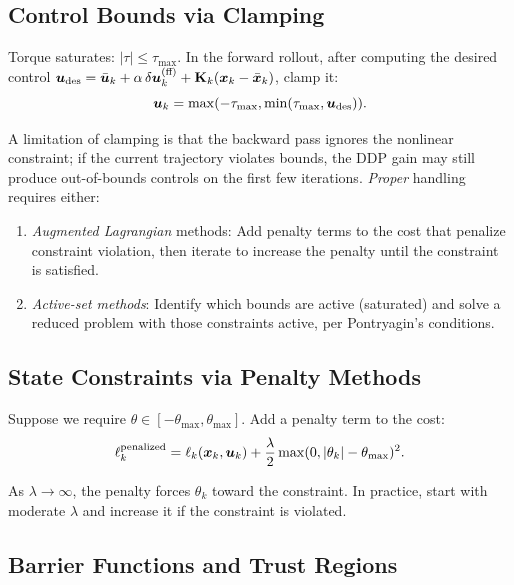 \subsection{Control Bounds via Clamping}

Torque saturates: $|\tau| \leq \tau_{\max}$. In the forward rollout, after computing the desired control
$\bm{u}_{\text{des}} = \bar{\bm{u}}_k + \alpha\,\delta\bm{u}_k^{(\text{ff})} + \mathbf{K}_k(\bm{x}_k - \bar{\bm{x}}_k)$, clamp it:
\begin{equation}
\bm{u}_k = \max(-\tau_{\max}, \min(\tau_{\max}, \bm{u}_{\text{des}})).
\label{eq:ch5:clamping}
\end{equation}

A limitation of clamping is that the backward pass ignores the nonlinear constraint; if the current trajectory
violates bounds, the DDP gain may still produce out-of-bounds controls on the first few iterations. \emph{Proper}
handling requires either:
\begin{enumerate}
\item \emph{Augmented Lagrangian} methods: Add penalty terms to the cost that penalize constraint violation, then
      iterate to increase the penalty until the constraint is satisfied.
\item \emph{Active-set methods}: Identify which bounds are active (saturated) and solve a reduced problem with those
      constraints active, per Pontryagin's conditions.
\end{enumerate}

\subsection{State Constraints via Penalty Methods}

Suppose we require $\theta \in [-\theta_{\max}, \theta_{\max}]$. Add a penalty term to the cost:
\begin{equation}
\ell_k^{\text{penalized}} = \ell_k(\bm{x}_k,\bm{u}_k) + \frac{\lambda}{2}\max(0, |\theta_k| - \theta_{\max})^2.
\label{eq:ch5:penalty-cost}
\end{equation}

As $\lambda \to \infty$, the penalty forces $\theta_k$ toward the constraint. In practice, start with moderate $\lambda$
and increase it if the constraint is violated.

\subsection{Barrier Functions and Trust Regions}

